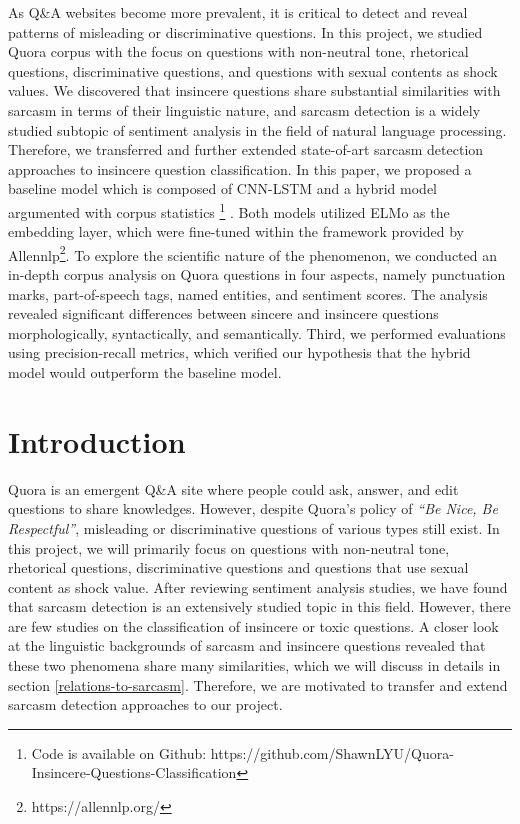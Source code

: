 \documentclass[12pt]{diazessay} %
\begin{document}
As Q\&A websites become more prevalent, it is critical to detect and reveal patterns of misleading or discriminative questions. In this project, we studied Quora corpus with the focus on questions with non-neutral tone, rhetorical questions, discriminative questions, and questions with sexual contents as shock values. We discovered that insincere questions share substantial similarities with sarcasm in terms of their linguistic nature, and sarcasm detection is a widely studied subtopic of sentiment analysis in the field of natural language processing. Therefore,  we transferred and further extended state-of-art sarcasm detection approaches to insincere question classification. In this paper, we proposed a baseline model which is composed of CNN-LSTM and a hybrid model argumented with corpus statistics \footnote{Code is available on Github: https://github.com/ShawnLYU/Quora-Insincere-Questions-Classification}
. Both models utilized ELMo \citep{peters2018deep} as the embedding layer, which were fine-tuned within the framework provided by Allennlp\footnote{https://allennlp.org/}. To explore the scientific nature of the phenomenon, we conducted an in-depth corpus analysis on Quora questions in four aspects, namely punctuation marks, part-of-speech tags, named entities, and sentiment scores. The analysis revealed significant differences between sincere and insincere questions morphologically, syntactically, and semantically. Third, we performed evaluations using precision-recall metrics, which verified our hypothesis that the hybrid model would outperform the baseline model. 


\section{Introduction}

Quora is an emergent Q\&A site where people could ask, answer, and edit questions to share knowledges. However, despite Quora's policy of \textit{``Be Nice, Be Respectful''}, misleading or discriminative questions of various types still exist. In this project, we will primarily focus on questions with non-neutral tone, rhetorical questions, discriminative questions and questions that use sexual content as shock value. After reviewing sentiment analysis studies, we have found that sarcasm detection is an extensively studied topic in this field. However, there are few studies on the classification of insincere or toxic questions. A closer look at the linguistic backgrounds of sarcasm and insincere questions revealed that these two phenomena share many similarities, which we will discuss in details in section \ref{relations-to-sarcasm}. Therefore, we are motivated to transfer and extend sarcasm detection approaches to our project. 
\end{document}

